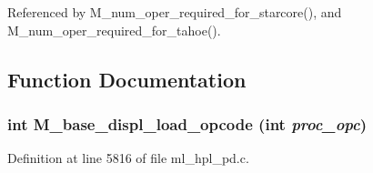 Referenced by M\_\-num\_\-oper\_\-required\_\-for\_\-starcore(), and M\_\-num\_\-oper\_\-required\_\-for\_\-tahoe().

\subsection{Function Documentation}
\subsubsection{\setlength{\rightskip}{0pt plus 5cm}int M\_\-base\_\-displ\_\-load\_\-opcode (int {\em proc\_\-opc})}\label{ml__hpl__pd_8c_eda289e31b38e91a23a4c13ffae4a03e}




Definition at line 5816 of file ml\_\-hpl\_\-pd.c.

